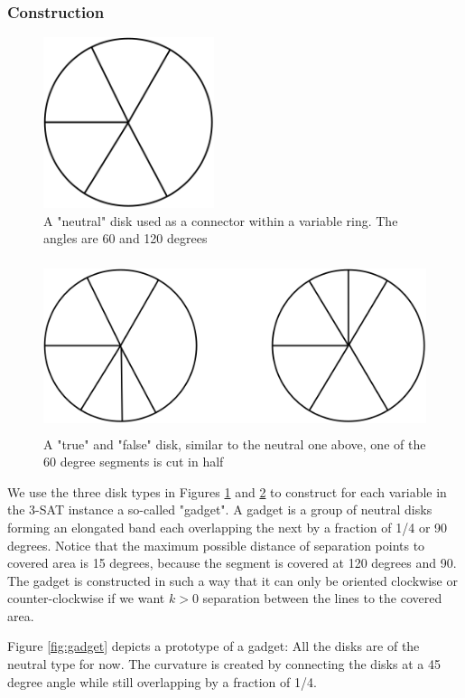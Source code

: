 \documentclass[a4paper,11pt]{article}
\begin{document}
\subsubsection*{Construction}
\begin{figure}[h]
  \centering
  \includegraphics[width=5cm, height=5cm]{assets/np-hardness/neutral.png}
  \caption{A "neutral" disk used as a connector within a variable ring. The angles are 60 and 120 degrees}
  \label{fig:neutral}
\end{figure}

\begin{figure}[h]
  \centering
  \includegraphics[height=5cm]{assets/np-hardness/true_false.png}
  \caption{A "true" and "false" disk, similar to the neutral one above, one of the 60 degree segments is cut in half}
  \label{fig:trueandfalse}
\end{figure}

We use the three disk types in Figures \ref{fig:neutral} and \ref{fig:trueandfalse} to construct for each variable in the 3-SAT instance a so-called "gadget". A gadget is a group of neutral disks forming an elongated band each overlapping the next by a fraction of 1/4 or 90 degrees. Notice that the maximum possible distance of separation points to covered area is 15 degrees, because the segment is covered at 120 degrees and 90. The gadget is constructed in such a way that it can only be oriented clockwise or counter-clockwise if we want $k>0$ separation between the lines to the covered area.

Figure \ref{fig:gadget} depicts a prototype of a gadget: All the disks are of the neutral type for now. The curvature is created by connecting the disks at a 45 degree angle while still overlapping by a fraction of 1/4.
\end{document}
